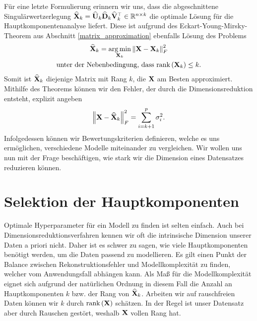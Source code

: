 Für eine letzte Formulierung erinnern wir uns, dass die abgeschnittene Singulärwertzerlegung $\widehat{\mathbf{X}}_k = \widehat{\mathbf{U}}_k \widehat{\mathbf{D}}_k \widehat{\mathbf{V}}_k^{\top} \in \mathbb{R}^{n \times k}$ die optimale Lösung für die Hauptkomponentenanalyse liefert. Diese ist aufgrund des Eckart-Young-Mirsky-Theorem aus Abschnitt \ref{matrix_approximation} ebenfalls Lösung des Problems
\begin{align}
\label{pca_best_rank_approximation}
\begin{gathered}
\widehat{\mathbf{X}}_k = \operatorname*{arg\,min}_{\mathbf{X}_k} \left\lVert \mathbf{X} - \mathbf{X}_k \right\rVert_F^2\\
\text{unter der Nebenbedingung, dass } \text{rank} \left( \mathbf{X}_k \right) \leq k.
\end{gathered}
\end{align}
Somit ist $\widehat{\mathbf{X}}_k$ diejenige Matrix mit Rang $k$, die $\mathbf{X}$ am Besten approximiert. Mithilfe des Theorems können wir den Fehler, der durch die Dimensionsreduktion entsteht, explizit angeben
\begin{align*}
\left\lVert \mathbf{X} - \widehat{\mathbf{X}}_k \right\rVert_F^2 = \sum_{i=k+1}^p \sigma_i^2.
\end{align*}
Infolgedessen können wir Bewertungskriterien definieren, welche es uns ermöglichen, verschiedene Modelle miteinander zu vergleichen. Wir wollen uns nun mit der Frage beschäftigen, wie stark wir die Dimension eines Datensatzes reduzieren können.




\section{Selektion der Hauptkomponenten}
\label{selection_principal_components}

Optimale Hyperparameter für ein Modell zu finden ist selten einfach. Auch bei Dimensionsreduktionsverfahren kennen wir oft die intrinsische Dimension unserer Daten a priori nicht. Daher ist es schwer zu sagen, wie viele Hauptkomponenten benötigt werden, um die Daten passend zu modellieren. Es gilt einen Punkt der Balance zwischen Rekonstruktionsfehler und Modellkomplexität zu finden, welcher vom Anwendungsfall abhängen kann. Als Maß für die Modellkomplexität eignet sich aufgrund der natürlichen Ordnung in diesem Fall die Anzahl an Hauptkomponenten $k$ bzw. der Rang von $\widehat{\mathbf{X}}_k$. Arbeiten wir auf rauschfreien Daten können wir $k$ durch $\text{rank} \left( \mathbf{X} \right)$ schätzen. In der Regel ist unser Datensatz aber durch Rauschen gestört, weshalb $\mathbf{X}$ vollen Rang hat.

